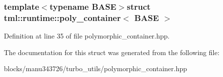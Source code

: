 \subsubsection*{template$<$typename B\+A\+S\+E$>$struct tml\+::runtime\+::poly\+\_\+container$<$ B\+A\+S\+E $>$}



Definition at line 35 of file polymorphic\+\_\+container.\+hpp.



The documentation for this struct was generated from the following file\+:\begin{DoxyCompactItemize}
\item 
blocks/manu343726/turbo\+\_\+utils/polymorphic\+\_\+container.\+hpp\end{DoxyCompactItemize}
